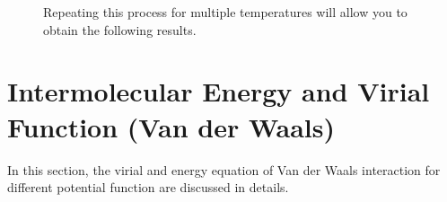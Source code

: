 \documentclass[letterpaper,10pt,english]{sphinxmanual}
\begin{document}
\begin{figure}[htbp]
\centering
\capstart

\noindent{}
\caption{Repeating this process for multiple temperatures will allow you to obtain the following results.}\label{\detokenize{putting_all_together:id1}}\end{figure}


\chapter{Intermolecular Energy and Virial Function (Van der Waals)}
\label{\detokenize{vdw_energy:intermolecular-energy-and-virial-function-van-der-waals}}\label{\detokenize{vdw_energy::doc}}
In this section, the virial and energy equation of Van der Waals interaction for different potential function are discussed in details.
\end{document}
